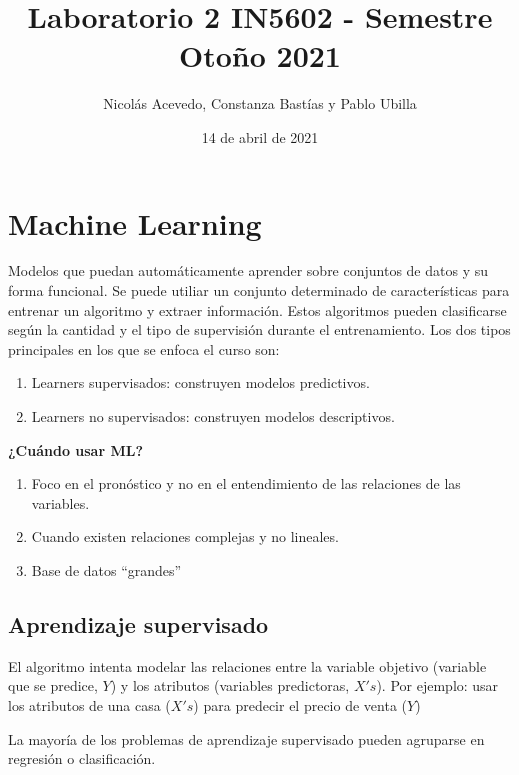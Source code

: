 \documentclass[
]{article}
\title{Laboratorio 2 IN5602 - Semestre Otoño 2021}
\author{Nicolás Acevedo, Constanza Bastías y Pablo Ubilla}
\date{14 de abril de 2021}
\providecommand{\tightlist}{%
  \setlength{\itemsep}{0pt}\setlength{\parskip}{0pt}}
\begin{document}
\maketitle

{
\setcounter{tocdepth}{2}
\tableofcontents
}
\hypertarget{machine-learning}{%
\section{Machine Learning}\label{machine-learning}}

Modelos que puedan automáticamente aprender sobre conjuntos de datos y
su forma funcional. Se puede utiliar un conjunto determinado de
características para entrenar un algoritmo y extraer información. Estos
algoritmos pueden clasificarse según la cantidad y el tipo de
supervisión durante el entrenamiento. Los dos tipos principales en los
que se enfoca el curso son:

\begin{enumerate}
\def\labelenumi{\arabic{enumi}.}
\tightlist
\item
  Learners supervisados: construyen modelos predictivos.
\item
  Learners no supervisados: construyen modelos descriptivos.
\end{enumerate}

\textbf{¿Cuándo usar ML?}

\begin{enumerate}
\def\labelenumi{\arabic{enumi}.}
\tightlist
\item
  Foco en el pronóstico y no en el entendimiento de las relaciones de
  las variables.
\item
  Cuando existen relaciones complejas y no lineales.
\item
  Base de datos ``grandes''
\end{enumerate}

\hypertarget{aprendizaje-supervisado}{%
\subsection{Aprendizaje supervisado}\label{aprendizaje-supervisado}}

El algoritmo intenta modelar las relaciones entre la variable objetivo
(variable que se predice, \(Y\)) y los atributos (variables predictoras,
\(X's\)). Por ejemplo: usar los atributos de una casa (\(X's\)) para
predecir el precio de venta (\(Y\))

La mayoría de los problemas de aprendizaje supervisado pueden agruparse
en regresión o clasificación.
\end{document}
